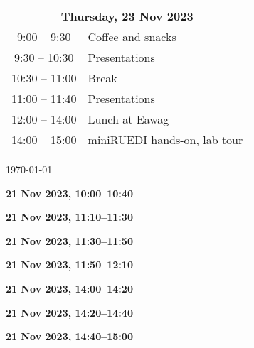 \documentclass[12pt]{extbook}
\renewcommand{\dateseparator}{--}
\newcommand{\breaktime}[1]{
\bigskip
\begin{center}
\Large\bfseries ***** Break #1 *****
\end{center}
\bigskip}
\renewcommand{\breaktime}[1]{}
\newcommand{\abstract}[2]{{
\bigskip
\begin{center}
\large\bfseries #1
\end{center}}
\par

\clearpage
}
\begin{document}
\begin{center}
\begin{tabular}{c@{\hskip 0.5in}l}
\multicolumn{2}{c}{\bf Thursday, 23 Nov 2023}\\[2ex]
\phantom{1}9:00  -- \phantom{1}9:30	  &	Coffee and snacks\\
\phantom{1}9:30  -- 10:30	&	Presentations\\   %
10:30 -- 11:00	&	Break\\
11:00 -- 11:40	& Presentations\\   %
12:00 -- 14:00	&	Lunch at Eawag\\
14:00 -- 15:00	&	miniRUEDI hands-on, lab tour\\[1.5ex]

\end{tabular}

\enlargethispage{2cm}
\vfill
\renewcommand{\dateseparator}{--}
{\hfill \tiny \today}

\end{center}

\clearpage






\abstract{21 Nov 2023, 10:00--10:40}{abstracts/Giroud} %

\breaktime{30 min}

\abstract{21 Nov 2023, 11:10--11:30}{abstracts/Moeck} %
\abstract{21 Nov 2023, 11:30--11:50}{abstracts/Roques} %
\abstract{21 Nov 2023, 11:50--12:10}{abstracts/Lightfoot} %

\breaktime{ / Lunch}

\abstract{21 Nov 2023, 14:00--14:20}{abstracts/Dutoit} %
\abstract{21 Nov 2023, 14:20--14:40}{abstracts/Strauch_Zimmer} %
\abstract{21 Nov 2023, 14:40--15:00}{abstracts/Wang} %

\breaktime{30 min}
\end{document}
